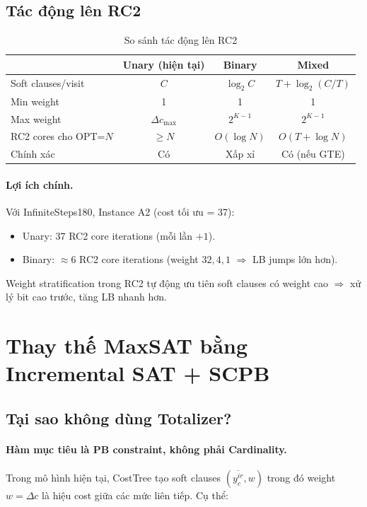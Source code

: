 \documentclass[11pt,a4paper]{article}
\begin{document}
\subsection{Tác động lên RC2}

\begin{table}[h]
\centering
\begin{tabular}{lccc}
\toprule
 & \textbf{Unary (hiện tại)} & \textbf{Binary} & \textbf{Mixed} \\
\midrule
Soft clauses/visit & $C$ & $\log_2 C$ & $T + \log_2(C/T)$ \\
Min weight & 1 & 1 & 1 \\
Max weight & $\Delta c_{\max}$ & $2^{K-1}$ & $2^{K-1}$ \\
RC2 cores cho OPT=$N$ & $\geq N$ & $O(\log N)$ & $O(T + \log N)$ \\
Chính xác & Có & Xấp xỉ & Có (nếu GTE) \\
\bottomrule
\end{tabular}
\caption{So sánh tác động lên RC2}
\end{table}

\paragraph{Lợi ích chính.} Với InfiniteSteps180, Instance A2 (cost tối ưu = 37):
\begin{itemize}
  \item Unary: 37 RC2 core iterations (mỗi lần $+1$).
  \item Binary: $\approx 6$ RC2 core iterations (weight $32, 4, 1$ $\Rightarrow$ LB jumps lớn hơn).
\end{itemize}

Weight stratification trong RC2 tự động ưu tiên soft clauses có weight cao $\Rightarrow$ xử lý bit cao trước, tăng LB nhanh hơn.


\section{Thay thế MaxSAT bằng Incremental SAT + SCPB}
\label{sec:sat-scpb}

\subsection{Tại sao không dùng Totalizer?}

\paragraph{Hàm mục tiêu là PB constraint, không phải Cardinality.}
Trong mô hình hiện tại, CostTree tạo soft clauses $(\overline{y_c^{ir}}, w)$ trong đó weight $w = \Delta c$ là hiệu cost giữa các mức liên tiếp. Cụ thể:
\end{document}
